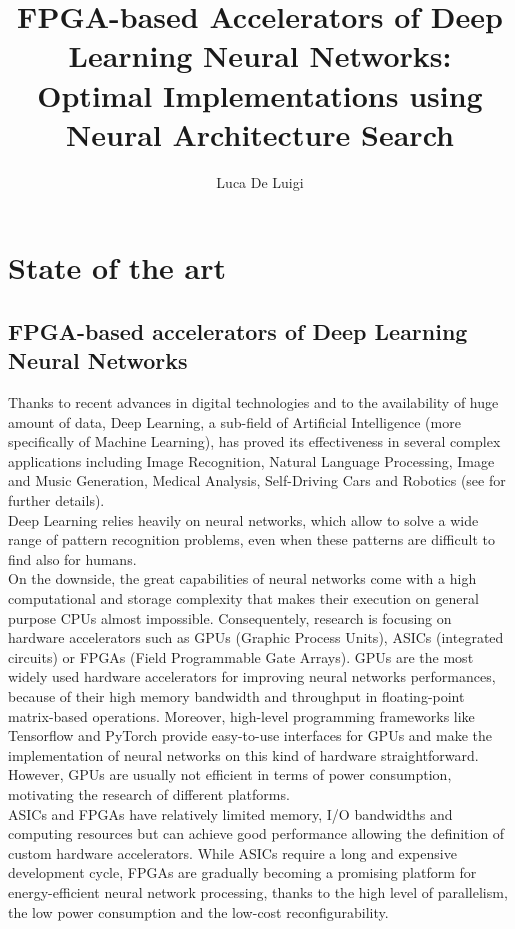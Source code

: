 \documentclass[11pt,a4paper]{article}
\author{Luca De Luigi}
\date{}
\title{FPGA-based Accelerators of Deep Learning Neural Networks: Optimal Implementations using Neural Architecture Search}
\begin{document}
\maketitle

\section{State of the art}
\subsection{FPGA-based accelerators of Deep Learning Neural Networks}
Thanks to recent advances in digital technologies and to the availability of huge amount of data, Deep Learning, a sub-field of Artificial Intelligence (more specifically of Machine Learning), has proved its effectiveness in several complex applications including Image Recognition, Natural Language Processing, Image and Music Generation, Medical Analysis, Self-Driving Cars and Robotics (see \cite{deep_learning_book} for further details).\\
Deep Learning relies heavily on neural networks, which allow to solve a wide range of pattern recognition problems, even when these patterns are difficult to find also for humans.\\
On the downside, the great capabilities of neural networks come with a high computational and storage complexity that makes their execution on general purpose CPUs almost impossible. Consequentely, research is focusing on hardware accelerators such as GPUs (Graphic Process Units), ASICs (integrated circuits) or FPGAs (Field Programmable Gate Arrays). GPUs are the most widely used hardware accelerators for improving neural networks performances, because of their high memory bandwidth and throughput in floating-point matrix-based operations. Moreover, high-level programming frameworks like Tensorflow and PyTorch provide easy-to-use interfaces for GPUs and make the implementation of neural networks on this kind of hardware straightforward. However, GPUs are usually not efficient in terms of power consumption, motivating the research of different platforms.\\
ASICs and FPGAs have relatively limited memory, I/O bandwidths and computing resources but can achieve good performance allowing the definition of custom hardware accelerators. While ASICs require a long and expensive development cycle, FPGAs are gradually becoming a promising platform for energy-efficient neural network processing, thanks to the high level of parallelism, the low power consumption and the low-cost reconfigurability.\\
\end{document}
